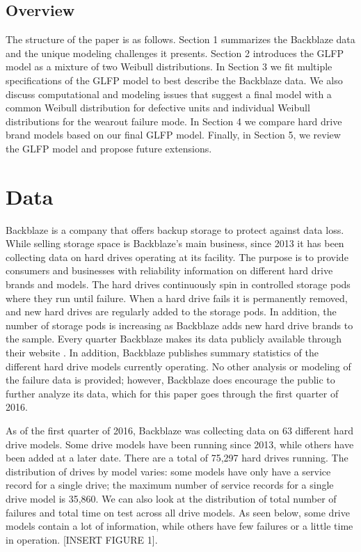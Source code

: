 \documentclass[12pt]{article}
\begin{document}
\subsection{Overview}
The structure of the paper is as follows.  Section 1 summarizes the Backblaze data and the unique modeling challenges it presents.  Section 2 introduces the GLFP model as a mixture of two Weibull distributions.  In Section 3 we fit multiple specifications of the GLFP model to best describe the Backblaze data.  We also discuss computational and modeling issues that suggest a final model with a common Weibull distribution for defective units and individual Weibull distributions for the wearout failure mode.  In Section 4 we compare hard drive brand models based on our final GLFP model.  Finally, in Section 5, we review the GLFP model and propose future extensions.

\section{Data}
Backblaze is a company that offers backup storage to protect against data loss.  While selling storage space is Backblaze's main business, since 2013 it has been collecting data on hard drives operating at its facility.  The purpose is to provide consumers and businesses with reliability information on different hard drive brands and models.  The hard drives continuously spin in controlled storage pods where they run until failure.  When a hard drive fails it is permanently removed, and new hard drives are regularly added to the storage pods.  In addition, the number of storage pods is increasing as Backblaze adds new hard drive brands to the sample.  Every quarter Backblaze makes its data publicly available through their website \cite{backblaze}. In addition, Backblaze publishes summary statistics of the different hard drive models currently operating.  No other analysis or modeling of the failure data is provided; however, Backblaze does encourage the public to further analyze its data, which for this paper goes through the first quarter of 2016.

As of the first quarter of 2016, Backblaze was collecting data on 63 different hard drive models.  Some drive models have been running since 2013, while others have been added at a later date.  There are a total of 75,297 hard drives running.  The distribution of drives by model varies: some models have only have a service record for a single drive; the maximum number of service records for a single drive model is 35,860.  We can also look at the distribution of total number of failures and total time on test across all drive models.  As seen below, some drive models contain a lot of information, while others have few failures or a little time in operation. [INSERT FIGURE 1]. \\
\end{document}
